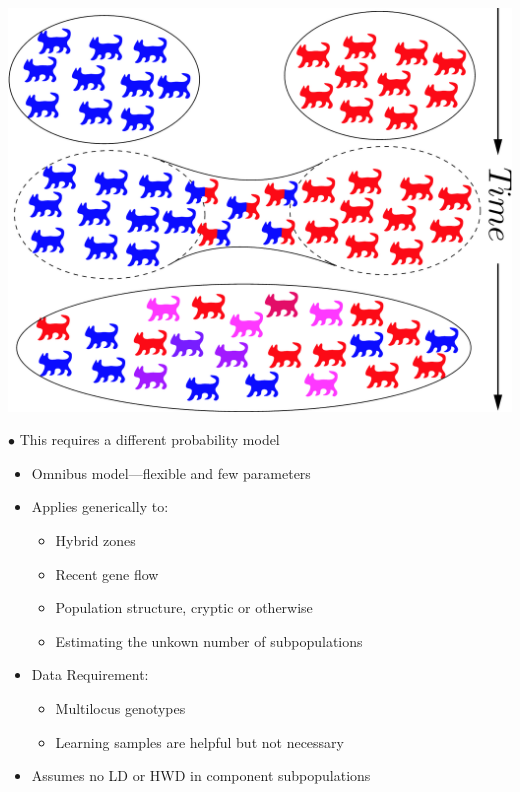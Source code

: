 \vspace*{-.3in}
\begin{center}
\includegraphics*[width=.75\textwidth]{illus/admixture_cats.pdf}
\end{center}
\noindent $\bullet$ This requires a different probability model



\begin{itemize}
\item Omnibus model---flexible and few parameters
\item Applies generically to:
\begin{itemize}
\item Hybrid zones
\item Recent gene flow
\item Population structure, cryptic or otherwise
\item Estimating the unkown number of subpopulations
\end{itemize}
\item Data Requirement:
\begin{itemize}
\item Multilocus genotypes
\item Learning samples are helpful but not necessary
\end{itemize}

\item Assumes no LD or HWD in component subpopulations
\end{itemize}





